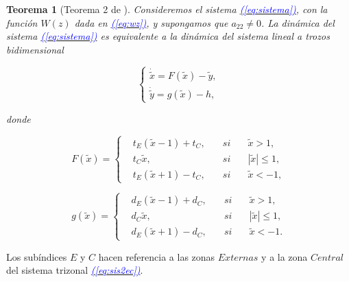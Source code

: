 \documentclass[12pt,a4paper]{report} %
\newtheorem{theorem}{Teorema}[chapter]
\newcommand{\eref}[1]{\hyperref[#1]{\textcolor{blue}{\textit{(\ref*{#1})}}}}
\begin{document}
	\begin{theorem}[Teorema 2 de \cite{ponce}]
		Consideremos el sistema \eref{eq:sistema}, con la función $W(z)$ dada en \eref{eq:wz}, y supongamos que $a_{22}\neq 0$. La dinámica del sistema \eref{eq:sistema} es equivalente a la dinámica del sistema lineal a trozos bidimensional
		
		\begin{equation}
			\label{eq:sis2ec}
			\left\{
			\begin{gathered}
				\dot{\tilde{x}}=F(\tilde{x})-\tilde{y}, \\[2mm]
				\dot{\tilde{y}}=g(\tilde{x})-h,
			\end{gathered}
			\right.
		\end{equation}
		
		donde
		
		\begin{equation}
			\label{eq:f1}
			F(\tilde{x})=
			\left\{
			\begin{aligned}
				&t_E(\tilde{x}-1)+t_C, \quad &si& \quad \tilde{x}>1,\\
				&t_C\tilde{x}, &si& \quad |\tilde{x}|\leq 1,\\
				&t_E(\tilde{x}+1)-t_C, \quad &si& \quad \tilde{x}<-1,
			\end{aligned}
			\right.
		\end{equation}\smallskip
		
		\begin{equation}
			\label{eq:g1}
			g(\tilde{x})=
			\left\{
			\begin{aligned}
				&d_E(\tilde{x}-1)+d_C, \quad &si& \quad \tilde{x}>1,\\
				&d_C\tilde{x}, &si& \quad |\tilde{x}|\leq 1,\\
				&d_E(\tilde{x}+1)-d_C, \quad &si& \quad \tilde{x}<-1.
			\end{aligned}
			\right.
		\end{equation}\smallskip
		
	\end{theorem}
	
 \vspace{0.5cm} Los subíndices $E$ y $C$ hacen referencia a las zonas $Externas$ y a la zona $Central$ del sistema trizonal \eref{eq:sis2ec}.
	
	\vspace{0.5cm}
		
\end{document}
